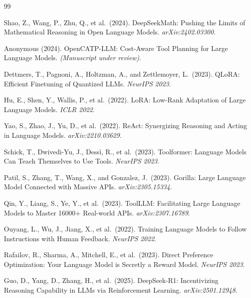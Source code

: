 \documentclass[10pt,twocolumn]{article}
\begin{document}

\begin{thebibliography}{99}

Shao, Z., Wang, P., Zhu, Q., et al.\ (2024).
\newblock DeepSeekMath: Pushing the Limits of Mathematical Reasoning in Open Language Models.
\newblock \textit{arXiv:2402.03300}.

Anonymous (2024).
\newblock OpenCATP-LLM: Cost-Aware Tool Planning for Large Language Models.
\newblock \textit{(Manuscript under review)}.

Dettmers, T., Pagnoni, A., Holtzman, A., and Zettlemoyer, L.\ (2023).
\newblock QLoRA: Efficient Finetuning of Quantized LLMs.
\newblock \textit{NeurIPS 2023}.

Hu, E., Shen, Y., Wallis, P., et al.\ (2022).
\newblock LoRA: Low-Rank Adaptation of Large Language Models.
\newblock \textit{ICLR 2022}.

Yao, S., Zhao, J., Yu, D., et al.\ (2022).
\newblock ReAct: Synergizing Reasoning and Acting in Language Models.
\newblock \textit{arXiv:2210.03629}.

Schick, T., Dwivedi-Yu, J., Dess{\`i}, R., et al.\ (2023).
\newblock Toolformer: Language Models Can Teach Themselves to Use Tools.
\newblock \textit{NeurIPS 2023}.

Patil, S., Zhang, T., Wang, X., and Gonzalez, J.\ (2023).
\newblock Gorilla: Large Language Model Connected with Massive APIs.
\newblock \textit{arXiv:2305.15334}.

Qin, Y., Liang, S., Ye, Y., et al.\ (2023).
\newblock ToolLLM: Facilitating Large Language Models to Master 16000+ Real-world APIs.
\newblock \textit{arXiv:2307.16789}.

Ouyang, L., Wu, J., Jiang, X., et al.\ (2022).
\newblock Training Language Models to Follow Instructions with Human Feedback.
\newblock \textit{NeurIPS 2022}.

Rafailov, R., Sharma, A., Mitchell, E., et al.\ (2023).
\newblock Direct Preference Optimization: Your Language Model is Secretly a Reward Model.
\newblock \textit{NeurIPS 2023}.

Guo, D., Yang, D., Zhang, H., et al.\ (2025).
\newblock DeepSeek-R1: Incentivizing Reasoning Capability in LLMs via Reinforcement Learning.
\newblock \textit{arXiv:2501.12948}.

\end{thebibliography}
\end{document}
